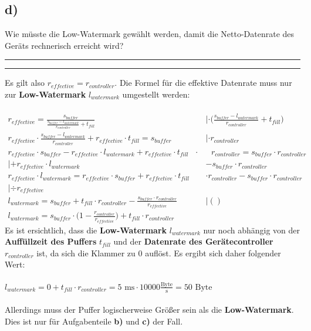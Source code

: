\documentclass{ti2}
\makeatletter
\renewenvironment{quote}{%
	\vskip 10\p@
	\parindent\z@
	\tcolorbox[
	breakable, sharp corners,
	boxrule=\z@, boxsep=\z@,
	left=\z@, right=\z@,
	top=\z@, bottom=\z@,
	colback=sx-yellow
	]
	{\color{sx-orange}\d@ublerule}
	\vskip 5\p@
	\list{}{\rightmargin\leftmargin}%
	\item\relax
}{%
\endlist
{\color{sx-orange}\d@ublerule}
\endtcolorbox
\vskip 5\p@
}
\def\d@ublerule{\hrule\@width\hsize\kern 1.5\p@\hrule\@width\hsize}
\makeatother
\begin{document}
	\subsection*{d)}
		\begin{quote}
			Wie müsste die Low-Watermark gewählt werden, damit die Netto-Datenrate des Geräts
			rechnerisch erreicht wird?
		\end{quote}
		Es gilt also $r_{effective} = r_{controller}$. Die Formel für die effektive Datenrate muss nur zur \textbf{Low-Watermark} $l_{watermark}$ umgestellt werden:\\ \\
		\begin{align}
			r_{effective} = \frac{s_{buffer}}{\frac{s_{buffer} - l_{watermark}}{r_{controller}} + t_{fill}} \quad &|\cdot \bigg(\frac{s_{buffer} - l_{watermark}}{r_{controller}} + t_{fill}\bigg)\\
			r_{effective} \cdot \frac{s_{buffer} - l_{watermark}}{r_{controller}} + r_{effective} \cdot t_{fill} = s_{buffer} \quad &| \cdot r_{controller}\\
			r_{effective} \cdot s_{buffer} - r_{effective} \cdot l_{watermark} + r_{effective} \cdot t_{fill} \text{ } \cdot & \text{ }r_{controller} = s_{buffer} \cdot r_{controller}  \nonumber\\ 
			| + r_{effective} \cdot l_{watermark} &- s_{buffer} \cdot r_{controller}\\
			r_{effective} \cdot l_{watermark} = r_{effective} \cdot s_{buffer} + r_{effective} \cdot t_{fill} &\cdot r_{controller} - s_{buffer} \cdot r_{controller} \nonumber\\
			| \div r_{effective}\\
			l_{watermark} = s_{buffer} + t_{fill} \cdot r_{controller} - \frac{s_{buffer} \cdot r_{controller}}{r_{effective}} \quad &| ()\\
			l_{watermark} = s_{buffer} \cdot \bigg(1 - \frac{r_{controller}}{r_{effective}}\bigg) + t_{fill} \cdot r_{controller}
		\end{align}
		Es ist ersichtlich, dass die \textbf{Low-Watermark} $l_{watermark}$ nur noch abhängig von der \textbf{Auffüllzeit des Puffers} $t_{fill}$ und der \textbf{Datenrate des Gerätecontroller} $r_{controller}$ ist, da sich die Klammer zu 0 auflöst. Es ergibt sich daher folgender Wert:\\ \\
		$l_{watermark} = 0 + t_{fill} \cdot r_{controller} = 5 \text{ ms} \cdot 10000 \frac{\text{Byte}}{\text{s}} = 50 \text{ Byte}$\\ \\
		Allerdings muss der Puffer logischerweise Größer sein als die \textbf{Low-Watermark}. Dies ist nur für Aufgabenteile \textbf{b)} und \textbf{c)} der Fall.
\end{document}
